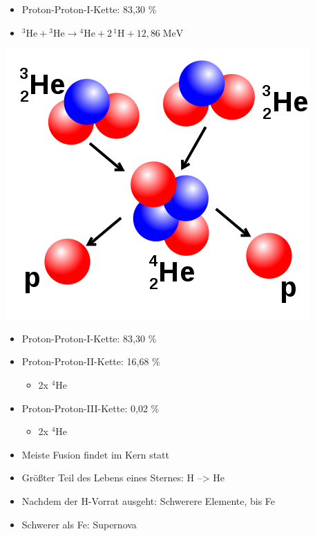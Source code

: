 \documentclass[10pt,a4paper, ngerman]{beamer}
\begin{document}
\begin{frame}{\subsecname}{\secname}
\begin{itemize}
\item Proton-Proton-I-Kette: 83,30 \%
\item \({\displaystyle \mathrm {{}^{3}He+{}^{3}He\to {}^{4}He+2\,{}^{1}H+12{,}86\;MeV} }\)
\end{itemize}
\centering
\includegraphics[height=0.5\textheight]{fids3}
\end{frame}

\begin{frame}{\subsecname}{\secname}
\begin{itemize}
\item Proton-Proton-I-Kette: 83,30 \%
\item Proton-Proton-II-Kette: 16,68 \%
\begin{itemize}
 \item 2x \({\displaystyle \mathrm {{}^{4}He}}\)
\end{itemize}
\item Proton-Proton-III-Kette: 0,02 \%
\begin{itemize}
	\item 2x \({\displaystyle \mathrm {{}^{4}He}}\)
\end{itemize}
\end{itemize}
\end{frame}

\begin{frame}{\subsecname}{\secname}
\begin{itemize}
\item Meiste Fusion findet im Kern statt
\item Größter Teil des Lebens eines Sternes: H --> He
\item Nachdem der H-Vorrat ausgeht: Schwerere Elemente, bis Fe
\item Schwerer als Fe: Supernova
\end{itemize}
\end{frame}
\end{document}

